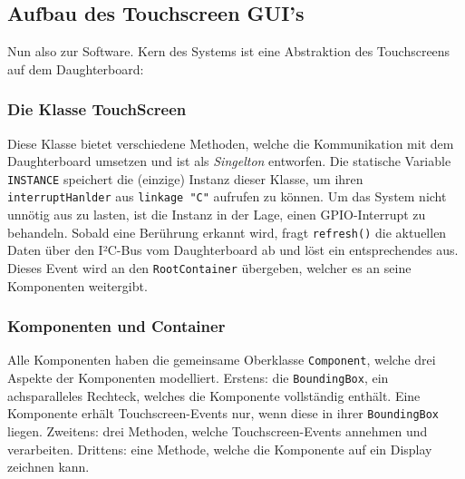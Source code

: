 \subsection{Aufbau des Touchscreen GUI's}
	Nun also zur Software. Kern des Systems ist eine Abstraktion des Touchscreens auf dem Daughterboard:
	
	\subsubsection{Die Klasse TouchScreen}\label{sec:touchscreen_class}
		\begin{figure}
			\scalebox{0.75}{
				\begin{tikzpicture}
					
				\end{tikzpicture}
			}
		\end{figure}
		Diese Klasse bietet verschiedene Methoden, welche die Kommunikation mit dem Daughterboard umsetzen und ist als \emph{Singelton} entworfen.
		Die statische Variable \texttt{INSTANCE} speichert die (einzige) Instanz dieser Klasse, um ihren \texttt{interruptHanlder} aus \texttt{linkage "C"} aufrufen zu können.
		Um das System nicht unnötig aus zu lasten, ist die Instanz in der Lage, einen GPIO-Interrupt zu behandeln.
		Sobald eine Berührung erkannt wird, fragt \texttt{refresh()} die aktuellen Daten über den I²C-Bus vom Daughterboard ab und löst ein entsprechendes  aus. Dieses Event wird an den \texttt{RootContainer} übergeben, welcher es an seine Komponenten weitergibt.
	
	\subsubsection{Komponenten und Container}\label{sec:components}
		\begin{figure}
			\scalebox{0.75}{
				\begin{tikzpicture}
					
				\end{tikzpicture}
			}
			\label{uml-component}
		\end{figure}
		Alle Komponenten haben die gemeinsame Oberklasse \texttt{Component}, welche drei Aspekte der Komponenten modelliert. Erstens: die \texttt{BoundingBox}, ein achsparalleles Rechteck, welches die Komponente vollständig enthält.
		Eine Komponente erhält Touchscreen-Events nur, wenn diese in ihrer \texttt{BoundingBox} liegen.
		Zweitens: drei Methoden, welche Touchscreen-Events annehmen und verarbeiten.
		Drittens: eine Methode, welche die Komponente auf ein Display zeichnen kann.
		
